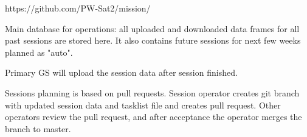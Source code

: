 
https://github.com/PW-Sat2/mission/

Main database for operations: all uploaded and downloaded data frames for all past sessions are stored here. It also contains future sessions for next few weeks planned as "auto".

Primary GS will upload the session data after session finished.

Sessions planning is based on pull requests. Session operator creates git branch with updated session data and tasklist file and creates pull request. Other operators review the pull request, and after acceptance the operator merges the branch to master.